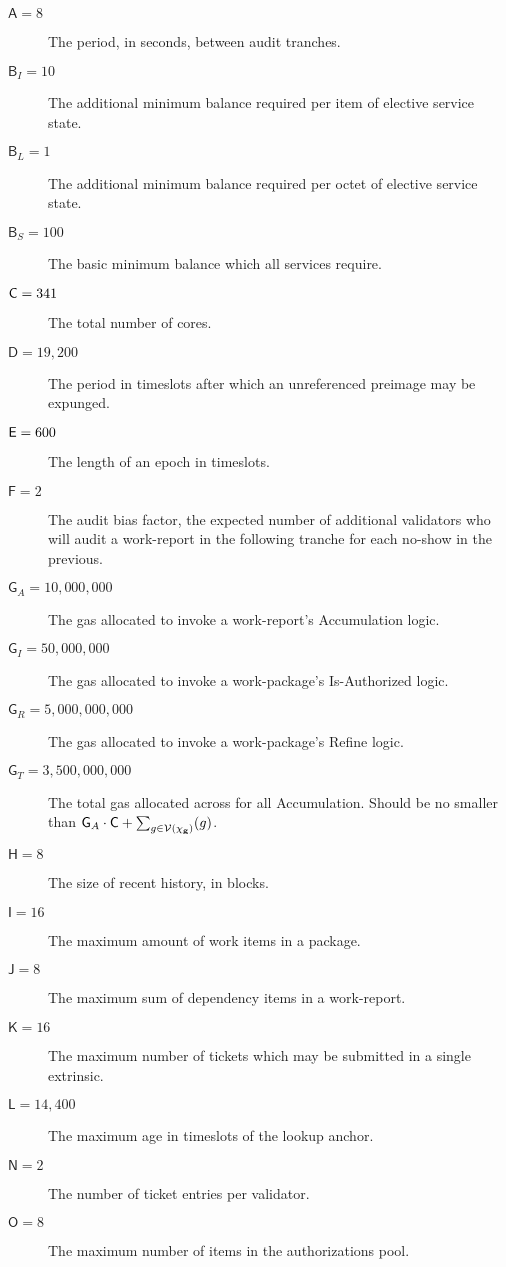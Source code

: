 \begin{description}
  \item[$\mathsf{A} = 8$] The period, in seconds, between audit tranches.
  \item[$\mathsf{B}_I = 10$] The additional minimum balance required per item of elective service state.
  \item[$\mathsf{B}_L = 1$] The additional minimum balance required per octet of elective service state.
  \item[$\mathsf{B}_S = 100$] The basic minimum balance which all services require.
  \item[$\mathsf{C} = 341$] The total number of cores.
  \item[$\mathsf{D} = 19,200$] The period in timeslots after which an unreferenced preimage may be expunged.
  \item[$\mathsf{E} = 600$] The length of an epoch in timeslots.
  \item[$\mathsf{F} = 2$] The audit bias factor, the expected number of additional validators who will audit a work-report in the following tranche for each no-show in the previous.
  \item[$\mathsf{G}_A = 10,000,000$] The gas allocated to invoke a work-report's Accumulation logic.
  \item[$\mathsf{G}_I = 50,000,000$] The gas allocated to invoke a work-package's Is-Authorized logic.
  \item[$\mathsf{G}_R = 5,000,000,000$] The gas allocated to invoke a work-package's Refine logic.
  \item[$\mathsf{G}_T = 3,500,000,000$] The total gas allocated across for all Accumulation. Should be no smaller than $\mathsf{G}_A\cdot\corecount + \sum_{g \in \values{\alwaysaccers}}(g)$.
  \item[$\mathsf{H} = 8$] The size of recent history, in blocks.
  \item[$\mathsf{I} = 16$] The maximum amount of work items in a package.
  \item[$\mathsf{J} = 8$] The maximum sum of dependency items in a work-report.
  \item[$\mathsf{K} = 16$] The maximum number of tickets which may be submitted in a single extrinsic.
  \item[$\mathsf{L} = 14,400$] The maximum age in timeslots of the lookup anchor.
  \item[$\mathsf{N} = 2$] The number of ticket entries per validator.
  \item[$\mathsf{O} = 8$] The maximum number of items in the authorizations pool.

\end{description}
